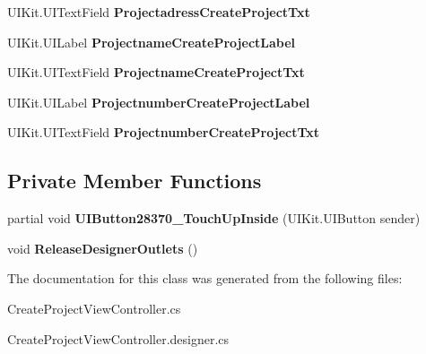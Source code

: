 \begin{DoxyCompactItemize}
U\+I\+Kit.\+U\+I\+Text\+Field {\bfseries Projectadress\+Create\+Project\+Txt}
\item 
\mbox{\label{class_ramboell_1_1i_o_s_1_1_create_project_view_controller_ae04af7506d0b28b97684b20e86eee003}} 
U\+I\+Kit.\+U\+I\+Label {\bfseries Projectname\+Create\+Project\+Label}
\item 
\mbox{\label{class_ramboell_1_1i_o_s_1_1_create_project_view_controller_a5f4211267278fd07d1c87e80e44b0438}} 
U\+I\+Kit.\+U\+I\+Text\+Field {\bfseries Projectname\+Create\+Project\+Txt}
\item 
\mbox{\label{class_ramboell_1_1i_o_s_1_1_create_project_view_controller_adc7af6ab26c913a163a990e30ba532ab}} 
U\+I\+Kit.\+U\+I\+Label {\bfseries Projectnumber\+Create\+Project\+Label}
\item 
\mbox{\label{class_ramboell_1_1i_o_s_1_1_create_project_view_controller_a465ea6dd697c6ad141a5649e73673d62}} 
U\+I\+Kit.\+U\+I\+Text\+Field {\bfseries Projectnumber\+Create\+Project\+Txt}
\end{DoxyCompactItemize}
\subsection*{Private Member Functions}
\begin{DoxyCompactItemize}
\item 
\mbox{\label{class_ramboell_1_1i_o_s_1_1_create_project_view_controller_a75be9c725e6e1ab766a459773b7e724f}} 
partial void {\bfseries U\+I\+Button28370\+\_\+\+Touch\+Up\+Inside} (U\+I\+Kit.\+U\+I\+Button sender)
\item 
\mbox{\label{class_ramboell_1_1i_o_s_1_1_create_project_view_controller_a4ccb377b17071383464bbea9284e4d0d}} 
void {\bfseries Release\+Designer\+Outlets} ()
\end{DoxyCompactItemize}


The documentation for this class was generated from the following files\+:\begin{DoxyCompactItemize}
\item 
Create\+Project\+View\+Controller.\+cs\item 
Create\+Project\+View\+Controller.\+designer.\+cs\end{DoxyCompactItemize}
